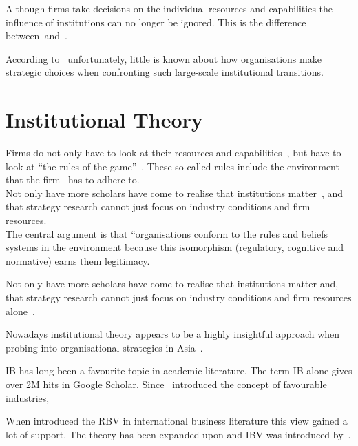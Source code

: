 Although firms take decisions on the individual resources and capabilities \cite{Barney:1991} the influence of institutions can no longer be ignored. This is the difference between~\rbv and~\ibv. 

According to~\cite{Peng:2003} unfortunately, little is known about how organisations make strategic choices when confronting such large-scale institutional transitions.

\section{Institutional Theory}

 Firms do not only have to look at their resources and capabilities~\cite{Barney:1991}, but have to look at ``the rules of the game''~\cite{Scott:1995}. These so called rules include the environment that the firm \mne~has to adhere to.\\


Not only have   more scholars have come to realise that institutions matter~\cite{Powell:1991,Scott:1995}, and that strategy research cannot just focus on industry conditions and firm resources.\\

The central argument is that “organisations conform to the rules and beliefs systems in the environment because this isomorphism (regulatory, cognitive and normative) earns them legitimacy.

Not only have more scholars have come to realise that institutions matter and, that strategy research cannot just focus on industry conditions and firm resources alone~\cite{Powell:1991,Scott:1995}.

Nowadays institutional theory appears to be a highly insightful approach when probing into organisational strategies in Asia~\cite{Hoskisson:2000}.

\Gls{IB} has long been a favourite topic in academic literature. The term \gls{IB} alone gives over 2M hits in Google Scholar. Since~\cite{Porter:1980} introduced the concept of favourable industries, 

When introduced the \gls{RBV} in international business literature this view gained a lot of support. 
The theory has been expanded upon and \gls{IBV} was introduced by~\cite{Kostova:1999,Meyer:2009,Wang:2012}.


\section{}

